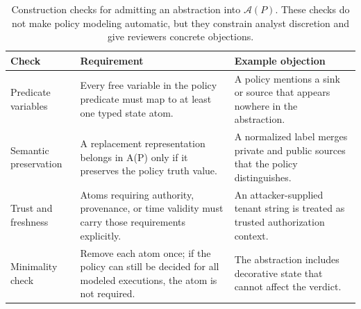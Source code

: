 \begin{table}[t]
  \caption{Construction checks for admitting an abstraction into
  $\mathcal{A}(P)$. These checks do not make policy modeling automatic, but
  they constrain analyst discretion and give reviewers concrete objections.}
  \label{tab:abstraction-construction}
  \centering\scriptsize
  \begin{tabular}{@{}p{}p{}p{}@{}}
    \toprule
    Check & Requirement & Example objection \\
    \midrule
    Predicate variables & Every free variable in the policy predicate must map to at least one typed state atom. & A policy mentions a sink or source that appears nowhere in the abstraction. \\
    Semantic preservation & A replacement representation belongs in A(P) only if it preserves the policy truth value. & A normalized label merges private and public sources that the policy distinguishes. \\
    Trust and freshness & Atoms requiring authority, provenance, or time validity must carry those requirements explicitly. & An attacker-supplied tenant string is treated as trusted authorization context. \\
    Minimality check & Remove each atom once; if the policy can still be decided for all modeled executions, the atom is not required. & The abstraction includes decorative state that cannot affect the verdict. \\
    \bottomrule
  \end{tabular}
\end{table}
